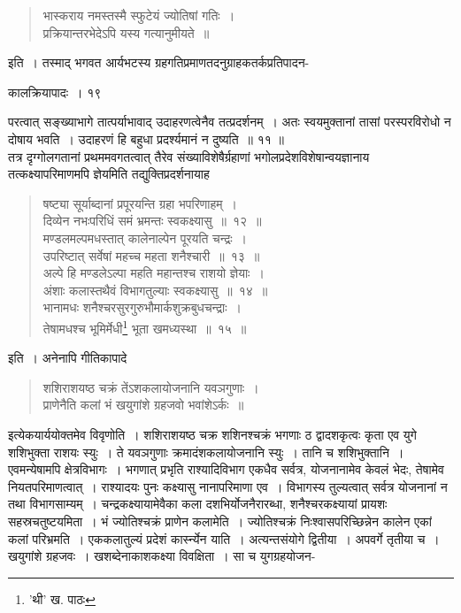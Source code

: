 \documentclass[11pt, openany]{book}
\begin{document}
{\begin{quote}
{\qt भास्कराय नमस्तस्मै स्फुटेयं ज्योतिषां गतिः~। \\
प्रक्रियान्तरभेदेऽपि यस्य गत्यानुमीयते~॥}
\end{quote}

\noindent इति~। तस्माद् भगवत आर्यभटस्य ग्रहगतिप्रमाणतदनुग्राहकतर्कप्रतिपादन- 


\newpage

\vspace{3cm} \hspace{4cm} कालक्रियापादः~। \hspace{4cm}१९ 

\vspace{0.3cm}
\noindent परत्वात् सङ्ख्याभागे तात्पर्याभावाद् उदाहरणत्वेनैव तत्प्रदर्शनम्~। अतः स्वयमुक्तानां तासां परस्परविरोधो न दोषाय भवति~। उदाहरणं हि बहुधा प्रदर्श्यमानं न दुष्यति~॥ ११ ॥ \\

तत्र दृग्गोलगतानां प्रथममवगतत्वात् तैरेव संख्याविशेषैर्ग्रहाणां भगोलप्रदेशविशेषान्वयज्ञानाय तत्कक्ष्यापरिमाणमपि ज्ञेयमिति तद्युक्तिप्रदर्शनायाह\textendash

\begin{quote}
{\ab षष्ट्या सूर्याब्दानां प्रपूरयन्ति ग्रहा भपरिणाहम्~।\\
दिव्येन नभःपरिधिं समं भ्रमन्तः स्वकक्ष्यासु~॥~१२~॥\\
मण्डलमल्पमधस्तात् कालेनाल्पेन पूरयति चन्द्रः~।\\
उपरिष्टात् सर्वेषां महच्च महता शनैश्चारी~॥~१३~॥\\
अल्पे हि मण्डलेऽल्पा महति महान्तश्च राशयो ज्ञेयाः~।\\
अंशाः कलास्तथैवं विभागतुल्याः स्वकक्ष्यासु~॥~१४~॥\\
भानामधः शनैश्चरसुरगुरुभौमार्कशुक्रबुधचन्द्राः~।\\
तेषामधश्च भूमिर्मेधी\renewcommand{\thefootnote}{१}\footnote{'थी' ख. पाठः} भूता खमध्यस्था~॥~१५~॥}
\end{quote}

इति~। अनेनापि गीतिकापादे\textendash

\begin{quote}
{\qt शशिराशयष्ठ चक्रं तेंऽशकलायोजनानि यवञगुणाः~।\\
प्राणेनैति कलां भं खयुगांशे ग्रहजवो भवांशेऽर्कः~॥}
\end{quote}

\noindent इत्येकयार्ययोक्तमेव विवृणोति~। शशिराशयष्ठ चक्र शशिनश्चक्रं भगणाः ठ द्वादशकृत्वः कृता एव युगे शशिभुक्ता राशयः स्युः~। ते यवञगुणाः क्रमादंशकलायोजनानि स्युः~। तानि च शशिभुक्तानि~। एवमन्येषामपि क्षेत्रविभागः~। भगणात् प्रभृति राश्यादिविभाग एकधैव सर्वत्र, योजनानामेव केवलं भेदः, तेषामेव नियतपरिमाणत्वात्~। राश्यादयः पुनः कक्ष्यासु नानापरिमाणा एव~। विभागस्य तुल्यत्वात् सर्वत्र योजनानां न तथा विभागसाम्यम्~। चन्द्रकक्ष्यायामेवैका कला दशभिर्योजनैरारब्धा, शनैश्चरकक्ष्यायां प्रायशः सहस्रचतुष्टयमिता~। भं ज्योतिश्चक्रं प्राणेन कलामेति~। ज्योतिश्चक्रं निःश्वासपरिच्छिन्नेन कालेन एकां कलां परिभ्रमति~। एककलातुल्यं प्रदेशं कार्स्न्येन याति~। अत्यन्तसंयोगे द्वितीया~। अपवर्गे तृतीया च~। खयुगांशे ग्रहजवः~। खशब्देनाकाशकक्ष्या विवक्षिता~। सा च युगग्रहयोजन-


}
\end{document}

